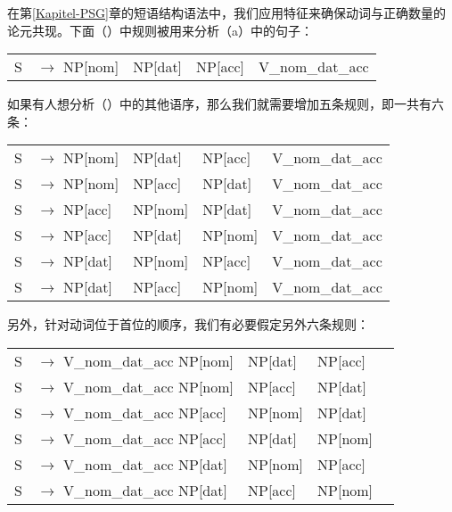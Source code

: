 \noindent
在第\ref{Kapitel-PSG}章的短语结构语法中，我们应用特征来确保动词与正确数量的论元共现。下面（）中规则被用来分析（a）中的句子：
\ea
\begin{tabular}[t]{@{}l@{ }l@{ }l@{ }l@{ }l@{ }}
S  & $\to$ NP[nom]& NP[dat] & NP[acc] & V\_nom\_dat\_acc\\
\end{tabular}
\z
如果有人想分析（）中的其他语序，那么我们就需要增加五条规则，即一共有六条：
\ea
\label{Regeln-PSG-Abfolge}
\begin{tabular}[t]{@{}l@{ }l@{ }l@{ }l@{ }l@{ }}
S  & $\to$ NP[nom]& NP[dat] & NP[acc] & V\_nom\_dat\_acc\\
S  & $\to$ NP[nom]& NP[acc] & NP[dat] & V\_nom\_dat\_acc\\
S  & $\to$ NP[acc]& NP[nom] & NP[dat] & V\_nom\_dat\_acc\\
S  & $\to$ NP[acc]& NP[dat] & NP[nom] & V\_nom\_dat\_acc\\
S  & $\to$ NP[dat]& NP[nom] & NP[acc] & V\_nom\_dat\_acc\\
S  & $\to$ NP[dat]& NP[acc] & NP[nom] & V\_nom\_dat\_acc\\
\end{tabular}
\z

\noindent
另外，针对动词位于首位的顺序，我们有必要假定另外六条规则：
\ea
\begin{tabular}[t]{@{}l@{ }l@{ }l@{ }l@{ }l}
S  & $\to$ V\_nom\_dat\_acc NP[nom]& NP[dat] & NP[acc]\\
S  & $\to$ V\_nom\_dat\_acc NP[nom]& NP[acc] & NP[dat]\\
S  & $\to$ V\_nom\_dat\_acc NP[acc]& NP[nom] & NP[dat]\\
S  & $\to$ V\_nom\_dat\_acc NP[acc]& NP[dat] & NP[nom]\\
S  & $\to$ V\_nom\_dat\_acc NP[dat]& NP[nom] & NP[acc]\\
S  & $\to$ V\_nom\_dat\_acc NP[dat]& NP[acc] & NP[nom]\\
\end{tabular}
\z

